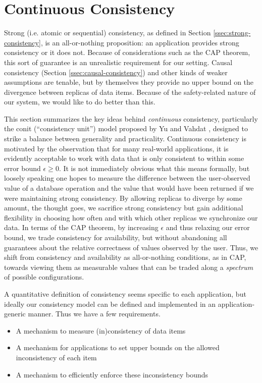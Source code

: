 \documentclass[]             %
{NASA}                       %
\theoremstyle{definition}
\providecommand{\tightlist}{%
  \setlength{\itemsep}{0pt}\setlength{\parskip}{0pt}}
\begin{document}
\section{Continuous Consistency}
\label{sec:continuous-consistency}
Strong (i.e. atomic or sequential) consistency, as defined in Section
\ref{ssec:strong-consistency}, is an all-or-nothing proposition: an
application provides strong consistency or it does not. Because of
considerations such as the CAP theorem, this sort of guarantee is an
unrealistic requirement for our setting. Causal consistency (Section
\ref{ssec:causal-consistency}) and other kinds of weaker assumptions
are tenable, but by themselves they provide no upper bound on the
divergence between replicas of data items. Because of the
safety-related nature of our system, we would like to do better than
this.

This section summarizes the key ideas behind \emph{continuous}
consistency, particularly the conit (``consistency unit'') model
proposed by Yu and Vahdat
\cite{2000tact,2000tactalgorithms,10.5555/1251229.1251250,DBLP:conf/icdcs/YuV01,2002tact},
designed to strike a balance between generality and
practicality. Continuous consistency is motivated by the observation
that for many real-world applications, it is evidently acceptable to
work with data that is only consistent to within some error bound
$\epsilon \geq 0$. It is not immediately obvious what this means
formally, but loosely speaking one hopes to measure the difference
between the user-observed value of a database operation and the value
that would have been returned if we were maintaining strong
consistency. By allowing replicas to diverge by some amount, the
thought goes, we sacrifice strong consistency but gain additional
flexibility in choosing how often and with which other replicas we
synchronize our data. In terms of the CAP theorem, by increasing
$\epsilon$ and thus relaxing our error bound, we trade consistency for
availability, but without abandoning all guarantees about the relative
correctness of values observed by the user. Thus, we shift from
consistency and availability as all-or-nothing conditions, as in CAP,
towards viewing them as measurable values that can be traded along a
\emph{spectrum} of possible configurations.

A quantitative definition of consistency seems specific to each
application, but ideally our consistency model can be defined and
implemented in an application-generic manner. Thus we have a few
requirements.
\begin{itemize}
  \tightlist
\item A mechanism to measure (in)consistency of data items
\item A mechanism for applications to set upper bounds on the allowed
  inconsistency of each item
\item A mechanism to efficiently enforce these inconsistency bounds
\end{itemize}
\end{document}

